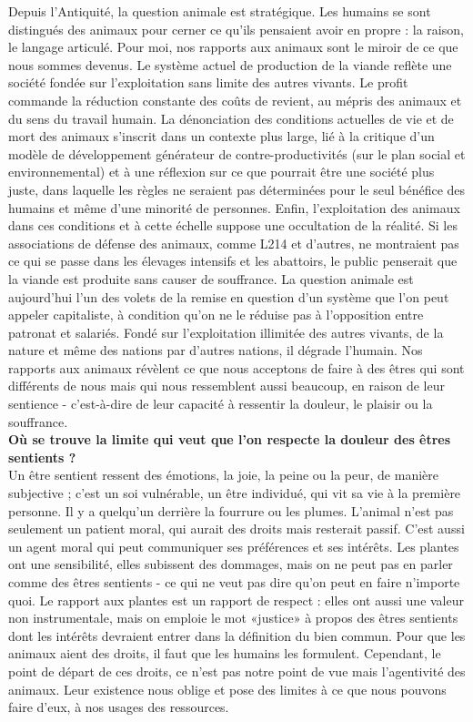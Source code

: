 \documentclass[10pt]{article}
\begin{document}
Depuis l’Antiquité, la question animale est stratégique. Les humains se sont distingués des animaux pour cerner ce qu’ils pensaient avoir en propre : la raison, le langage articulé. Pour moi, nos rapports aux animaux sont le miroir de ce que nous sommes devenus. Le système actuel de production de la viande reflète une société fondée sur l’exploitation sans limite des autres vivants. Le profit commande la réduction constante des coûts de revient, au mépris des animaux et du sens du travail humain. La dénonciation des conditions actuelles de vie et de mort des animaux s’inscrit dans un contexte plus large, lié à la critique d’un modèle de développement générateur de contre-productivités (sur le plan social et environnemental) et à une réflexion sur ce que pourrait être une société plus juste, dans laquelle les règles ne seraient pas déterminées pour le seul bénéfice des humains et même d’une minorité de personnes. Enfin, l’exploitation des animaux dans ces conditions et à cette échelle suppose une occultation de la réalité. Si les associations de défense des animaux, comme L214 et d’autres, ne montraient pas ce qui se passe dans les élevages intensifs et les abattoirs, le public penserait que la viande est produite sans causer de souffrance. La question animale est aujourd’hui l’un des volets de la remise en question d’un système que l’on peut appeler capitaliste, à condition qu’on ne le réduise pas à l’opposition entre patronat et salariés. Fondé sur l’exploitation illimitée des autres vivants, de la nature et même des nations par d’autres nations, il dégrade l’humain. Nos rapports aux animaux révèlent ce que nous acceptons de faire à des êtres qui sont différents de nous mais qui nous ressemblent aussi beaucoup, en raison de leur sentience - c’est-à-dire de leur capacité à ressentir la douleur, le plaisir ou la souffrance.\\

\textbf{Où se trouve la limite qui veut que l’on respecte la douleur des êtres sentients ?}\\

Un être sentient ressent des émotions, la joie, la peine ou la peur, de manière subjective ; c’est un soi vulnérable, un être individué, qui vit sa vie à la première personne. Il y a quelqu’un derrière la fourrure ou les plumes. L’animal n’est pas seulement un patient moral, qui aurait des droits mais resterait passif. C’est aussi un agent moral qui peut communiquer ses préférences et ses intérêts. Les plantes ont une sensibilité, elles subissent des dommages, mais on ne peut pas en parler comme des êtres sentients - ce qui ne veut pas dire qu’on peut en faire n’importe quoi. Le rapport aux plantes est un rapport de respect : elles ont aussi une valeur non instrumentale, mais on emploie le mot «justice» à propos des êtres sentients dont les intérêts devraient entrer dans la définition du bien commun. Pour que les animaux aient des droits, il faut que les humains les formulent. Cependant, le point de départ de ces droits, ce n’est pas notre point de vue mais l’agentivité des animaux. Leur existence nous oblige et pose des limites à ce que nous pouvons faire d’eux, à nos usages des ressources.\\
\end{document}
